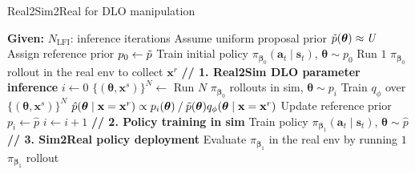 \begin{algorithm}[t]
\caption{Real2Sim2Real for DLO manipulation}
\label{alg:real2sim2real-bsim}
\begin{algorithmic}[1]
    \State \textbf{Given:} $N_{\text{LFI}}$: inference iterations
    \State Assume uniform proposal prior $\Tilde{p}(\boldsymbol{\theta}) \approx \mathit{U}$
    \State Assign reference prior $p_0 \gets \Tilde{p}$
    \State Train initial policy $\pi_{\boldsymbol{\beta}_0}(\mathbf{a}_t \mid \mathbf{s}_t)$, $\boldsymbol{\theta} \sim p_0$
    \State Run $1$ $\pi_{\boldsymbol{\beta}_0}$ rollout in the real env to collect $\mathbf{x}^r$
    \State \textbf{// 1. Real2Sim DLO parameter inference}
    \State $i \gets 0$
     \label{alg:r2s2r:line:lfi-iter}
        \State $\{(\boldsymbol{\theta}, \mathbf{x}^s)\}^N \gets$ Run $N$ $\pi_{\boldsymbol{\beta}_0}$ rollouts in sim, $\boldsymbol{\theta} \sim p_i$
        \State Train $q_{\phi}$ over $\{(\boldsymbol{\theta}, \mathbf{x}^s)\}^N$
        \State $\hat{p}(\boldsymbol{\theta} \mid \mathbf{x} = \mathbf{x}^r) \propto p_i(\boldsymbol{\theta}) \mathbin{/} \Tilde{p}(\boldsymbol{\theta}) q_{\phi}(\boldsymbol{\theta} \mid \mathbf{x} = \mathbf{x}^r)$
        \State Update reference prior $p_i \gets \hat{p}$ \label{alg:r2s2r:line:p-update}
        \State $i \gets i + 1$
    \EndWhile
    \State \textbf{// 2. Policy training in sim}
    \State Train policy $\pi_{\boldsymbol{\beta}_1}(\mathbf{a}_t \mid \mathbf{s}_t)$, $\boldsymbol{\theta} \sim \hat{p}$
    \State \textbf{// 3. Sim2Real policy deployment}
    \State Evaluate $\pi_{\boldsymbol{\beta}_1}$ in the real env by running $1$ $\pi_{\boldsymbol{\beta}_1}$ rollout
\end{algorithmic}
\end{algorithm}
